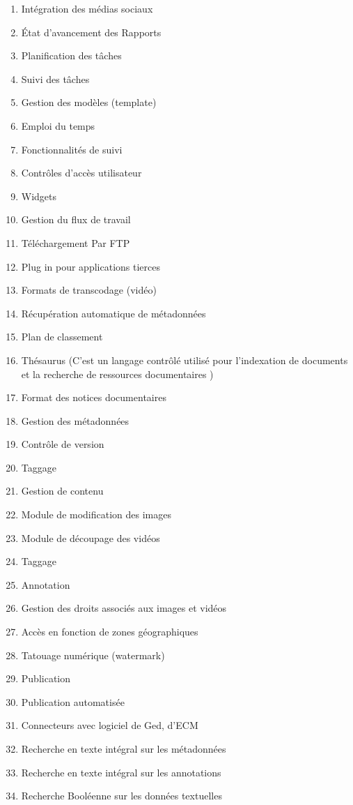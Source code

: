 \begin{enumerate}
\item Intégration des médias sociaux
\item État d'avancement des Rapports 
\item Planification des tâches
\item Suivi des tâches
\item Gestion des modèles (template) 
\item Emploi du temps
\item Fonctionnalités de suivi
\item Contrôles d'accès utilisateur
\item Widgets
\item Gestion du flux de travail
\item Téléchargement Par FTP	
\item Plug in pour applications tierces	
\item Formats de transcodage (vidéo)	
\item Récupération automatique de métadonnées	
\item Plan de classement	
\item Thésaurus	(C'est un langage contrôlé utilisé pour l'indexation de documents et la recherche de ressources documentaires )
\item Format des notices documentaires	
\item Gestion des métadonnées
\item Contrôle de version 
\item Taggage	
\item  Gestion de contenu
\item  Module de modification des images	
\item Module de découpage des vidéos	
\item Taggage	
\item Annotation	
\item  Gestion des droits associés aux images et vidéos	
\item  Accès en fonction de zones géographiques	
\item  Tatouage numérique (watermark)	
\item Publication	
\item Publication automatisée	
\item Connecteurs avec logiciel de Ged, d’ECM	
\item  Recherche en texte intégral sur les métadonnées	
\item  Recherche en texte intégral sur les annotations	
\item  Recherche Booléenne sur les données textuelles	

\end{enumerate}
